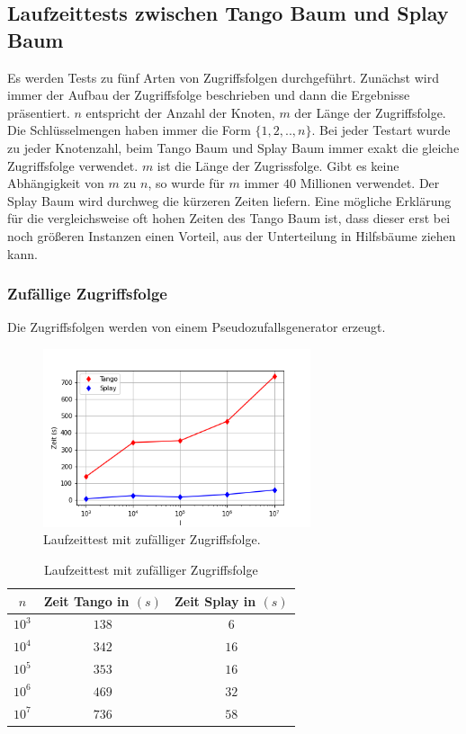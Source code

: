\documentclass[a4paper,12pt]{article}
\begin{document}
\subsection {Laufzeittests zwischen Tango Baum und Splay Baum}






Es werden Tests zu fünf Arten von Zugriffsfolgen durchgeführt. Zunächst wird immer der Aufbau der Zugriffsfolge beschrieben und dann die Ergebnisse präsentiert. $n$ entspricht der Anzahl der Knoten, $m$ der Länge der Zugriffsfolge. Die Schlüsselmengen haben immer die Form $\{1,2,..,n\}$. Bei jeder Testart wurde zu jeder Knotenzahl, beim Tango Baum und Splay Baum immer exakt die gleiche Zugriffsfolge verwendet.  $m$ ist die Länge der Zugrissfolge. Gibt es keine Abhängigkeit von $m$ zu $n$, so wurde für $m$ immer $40$ Millionen verwendet. Der Splay Baum wird durchweg die kürzeren Zeiten liefern. Eine mögliche Erklärung für die vergleichsweise oft hohen Zeiten des Tango Baum ist, dass dieser erst bei noch größeren Instanzen einen Vorteil, aus der Unterteilung in Hilfsbäume ziehen kann.  

\subsubsection{Zufällige Zugriffsfolge}
Die Zugriffsfolgen werden von einem Pseudozufallsgenerator erzeugt. 
\begin{figure}[H]
	\centering
	\includegraphics[width=0.7\textwidth]{"Medien/laufzeittest/diagramm/randomaccess"}
	\caption{Laufzeittest mit zufälliger Zugriffsfolge.}
	
\end{figure}
\begin{table}[H]
	\begin{center}
		\begin{tabular}[c]{|c|c|c|}
			\hline
			$n$ & Zeit Tango in $\left(s\right)$ &Zeit Splay in $\left(s\right)$ \\
			\hline
			$10^3$ & $138$ &$6$ \\
			\hline
			$10^4$  & $342$ &$16$  \\
			\hline
			$10^5$  & $353$ &$16$  \\
			\hline
			$10^6$  & $469$ &$32$  \\
			\hline
			$10^7$  & $736$ &$58$  \\
			\hline
		\end{tabular}
		\caption{Laufzeittest mit zufälliger Zugriffsfolge} 
	\end{center}
\end{table}
\end{document}
